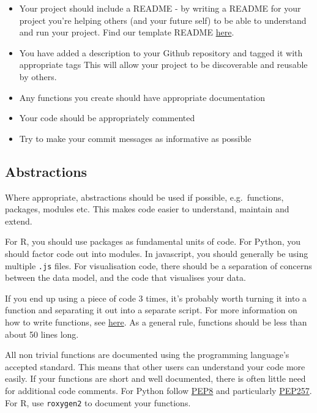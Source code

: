 \documentclass[]{book}
\begin{document}
\begin{itemize}
\item
  Your project should include a README - by writing a README for your project you're helping others (and your future self) to be able to understand and run your project. Find our template README \href{https://github.com/moj-analytical-services/our-coding-standards/blob/master/README_template.md}{here}.
\item
  You have added a description to your Github repository and tagged it with appropriate tags This will allow your project to be discoverable and reusable by others.
\item
  Any functions you create should have appropriate documentation
\item
  Your code should be appropriately commented
\item
  Try to make your commit messages as informative as possible
\end{itemize}

\hypertarget{functions}{%
\subsection*{Abstractions}\label{functions}}

Where appropriate, abstractions should be used if possible, e.g.~functions, packages, modules etc. This makes code easier to understand, maintain and extend.

For R, you should use packages as fundamental units of code. For Python, you should factor code out into modules. In javascript, you should generally be using multiple \texttt{.js} files. For visualisation code, there should be a separation of concerns between the data model, and the code that visualises your data.

If you end up using a piece of code 3 times, it's probably worth turning it into a function and separating it out into a separate script. For more information on how to write functions, see \href{https://github.com/moj-analytical-services/writing_functions_in_r}{here}. As a general rule, functions should be less than about 50 lines long.

All non trivial functions are documented using the programming language's accepted standard.
This means that other users can understand your code more easily. If your functions are short and well documented, there is often little need for additional code comments.
For Python follow \href{https://www.python.org/dev/peps/pep-0008/}{PEP8} and particularly \href{https://www.python.org/dev/peps/pep-0257/}{PEP257}.
For R, use \texttt{roxygen2} to document your functions.
\end{document}
